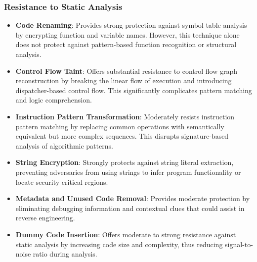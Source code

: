\documentclass[conference]{IEEEtran}
\begin{document}
\subsubsection{Resistance to Static Analysis}
\begin{itemize}
    \item \textbf{Code Renaming}: Provides strong protection against symbol table analysis by encrypting function and variable names. However, this technique alone does not protect against pattern-based function recognition or structural analysis.
    
    \item \textbf{Control Flow Taint}: Offers substantial resistance to control flow graph reconstruction by breaking the linear flow of execution and introducing dispatcher-based control flow. This significantly complicates pattern matching and logic comprehension.
    
    \item \textbf{Instruction Pattern Transformation}: Moderately resists instruction pattern matching by replacing common operations with semantically equivalent but more complex sequences. This disrupts signature-based analysis of algorithmic patterns.
    
    \item \textbf{String Encryption}: Strongly protects against string literal extraction, preventing adversaries from using strings to infer program functionality or locate security-critical regions.
    
    \item \textbf{Metadata and Unused Code Removal}: Provides moderate protection by eliminating debugging information and contextual clues that could assist in reverse engineering.
    
    \item \textbf{Dummy Code Insertion}: Offers moderate to strong resistance against static analysis by increasing code size and complexity, thus reducing signal-to-noise ratio during analysis.
\end{itemize}
\end{document}
